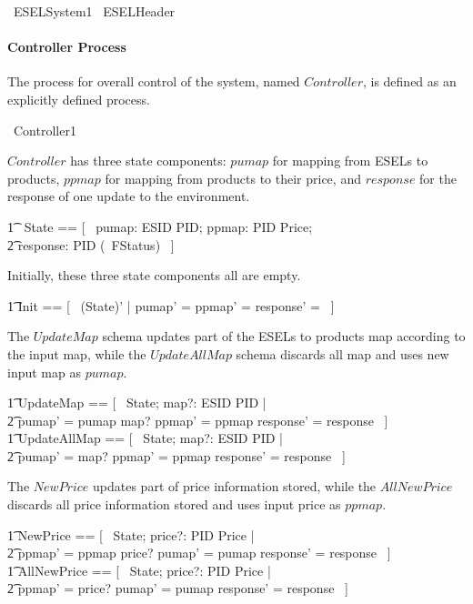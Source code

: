 \begin{zsection}
	\SECTION\ ESELSystem1 \parents\ ESELHeader 
\end{zsection}

\paragraph{Controller Process}
The process for overall control of the system, named $Controller$, is defined as an explicitly defined process.

\begin{circus}
	\circprocess\ Controller1 \circdef \circbegin \\
\end{circus}

$Controller$ has three state components: $pumap$ for mapping from ESELs to products, $ppmap$ for mapping from products to their price, and $response$ for the response of one update to the environment.
\begin{circusaction}
    	\t1 \circstate\ State == [~ pumap: ESID \pfun PID; ppmap: PID \pfun Price; \\
            \t2 response: PID \pfun (\power~FStatus) ~]
\end{circusaction}
Initially, these three state components all are empty.
\begin{zed}
    	\t1	Init == [~ (State)' | pumap' = \emptyset \land ppmap' = \emptyset \land response' = \emptyset ~]
\end{zed}
The $UpdateMap$ schema updates part of the ESELs to products map according to the input map, while the $UpdateAllMap$ schema discards all map and uses new input map as $pumap$. 
\begin{zed}
        \t1 UpdateMap == [~ \Delta State; map?: ESID \pfun PID | \\
            \t2 pumap' = pumap \oplus map? \land ppmap' = ppmap \land response' = response ~] \\
        \t1 UpdateAllMap == [~ \Delta State; map?: ESID \pfun PID | \\
            \t2 pumap' = map? \land ppmap' = ppmap \land response' = response ~] 
\end{zed}
The $NewPrice$ updates part of price information stored, while the $AllNewPrice$ discards all price information stored and uses input price as $ppmap$. 
\begin{zed}
        \t1 NewPrice == [~ \Delta State; price?: PID \pfun Price | \\
            \t2 ppmap' = ppmap \oplus price? \land pumap' = pumap \land response' = response ~] \\
        \t1 AllNewPrice == [~ \Delta State; price?: PID \pfun Price | \\
            \t2 ppmap' = price? \land pumap' = pumap \land response' = response ~]
\end{zed}

